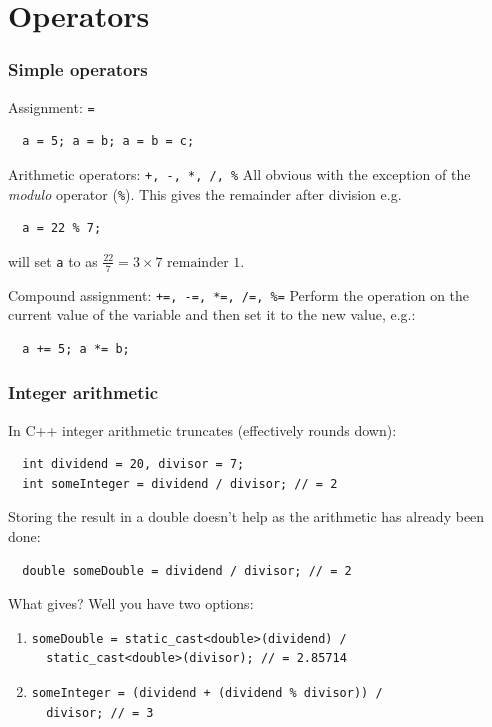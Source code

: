 \documentclass{beamer}
\begin{document}
\section{Operators}

\begin{frame}[fragile]
 \frametitle{Simple operators}
 \begin{block}{Assignment: \texttt{=}}
    \begin{lstlisting}
  a = 5; a = b; a = b = c; 
   \end{lstlisting}
  \end{block}
  \pause
  \begin{block}{Arithmetic operators: \texttt{+, -, *, /, \%}}
   All obvious with the exception of the \textit{modulo} operator (\texttt{\%}).  This gives the remainder after division e.g.
  \begin{lstlisting}
  a = 22 % 7;
  \end{lstlisting}
  will set \texttt{a} to  as $\frac{22}{7} = 3 \times 7 \text{ remainder } 1$.
 \end{block}
 \pause
 \begin{block}{Compound assignment: \texttt{+=, -=, *=, /=, \%=}}
  Perform the operation on the current value of the variable and then set it to the new value, e.g.:
  \begin{lstlisting}
  a += 5; a *= b;
  \end{lstlisting}
 \end{block} %
\end{frame}


\begin{frame}[fragile]
  \frametitle{Integer arithmetic}
  
  \begin{warnblocke}
  	In C++ integer arithmetic truncates (effectively rounds down):
  	\begin{lstlisting}
  int dividend = 20, divisor = 7;
  int someInteger = dividend / divisor; // = 2
  	\end{lstlisting}
  	Storing the result in a double doesn't help as the arithmetic has already been done:
  	\begin{lstlisting}
  double someDouble = dividend / divisor; // = 2
  	\end{lstlisting}
  	What gives?\pause{}  Well you have two options:
  	\begin{enumerate}
  	  \item{
  	  	\begin{lstlisting}
someDouble = static_cast<double>(dividend) /
  static_cast<double>(divisor); // = 2.85714
  	  	\end{lstlisting}}
  	  \pause
  	  \item{
				\begin{lstlisting}
someInteger = (dividend + (dividend % divisor)) /
  divisor; // = 3
				\end{lstlisting}
  	  }
  	\end{enumerate}
  \end{warnblocke}

\end{frame}
\end{document}
